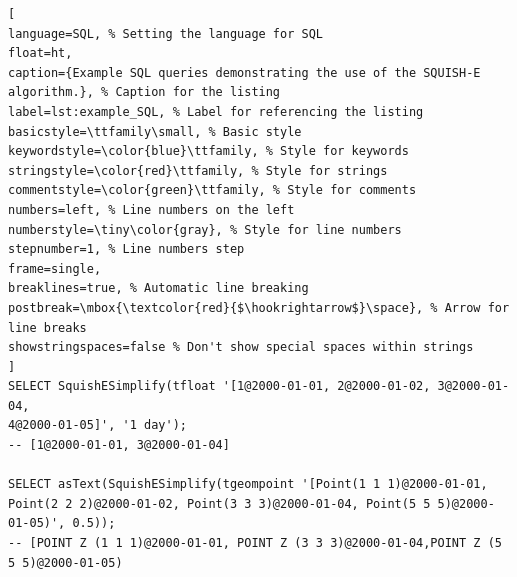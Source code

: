\begin{lstlisting}[
language=SQL, % Setting the language for SQL
float=ht,
caption={Example SQL queries demonstrating the use of the SQUISH-E algorithm.}, % Caption for the listing
label=lst:example_SQL, % Label for referencing the listing
basicstyle=\ttfamily\small, % Basic style
keywordstyle=\color{blue}\ttfamily, % Style for keywords
stringstyle=\color{red}\ttfamily, % Style for strings
commentstyle=\color{green}\ttfamily, % Style for comments
numbers=left, % Line numbers on the left
numberstyle=\tiny\color{gray}, % Style for line numbers
stepnumber=1, % Line numbers step
frame=single,
breaklines=true, % Automatic line breaking
postbreak=\mbox{\textcolor{red}{$\hookrightarrow$}\space}, % Arrow for line breaks
showstringspaces=false % Don't show special spaces within strings
]
SELECT SquishESimplify(tfloat '[1@2000-01-01, 2@2000-01-02, 3@2000-01-04,
4@2000-01-05]', '1 day');
-- [1@2000-01-01, 3@2000-01-04]

SELECT asText(SquishESimplify(tgeompoint '[Point(1 1 1)@2000-01-01,
Point(2 2 2)@2000-01-02, Point(3 3 3)@2000-01-04, Point(5 5 5)@2000-01-05)', 0.5));
-- [POINT Z (1 1 1)@2000-01-01, POINT Z (3 3 3)@2000-01-04,POINT Z (5 5 5)@2000-01-05)

\end{lstlisting}
